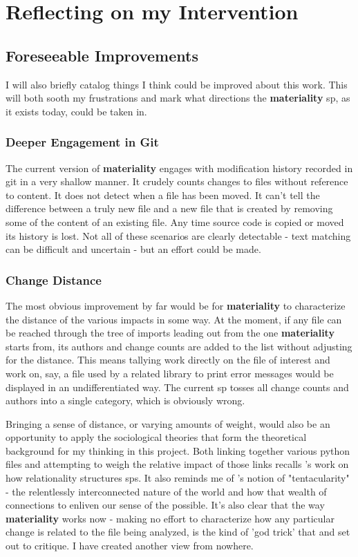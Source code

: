 \documentclass[a4paper,man,natbib,floatsintext]{apa6}
\begin{document}
  \section{Reflecting on my Intervention}
  
  \subsection{Foreseeable Improvements}
  I will also briefly catalog things I think could be improved about this work. This will both sooth my frustrations and mark what directions the \textbf{materiality} \gls{sp}, as it exists today, could be taken in.

  \subsubsection{Deeper Engagement in Git}
  The current version of \textbf{materiality} engages with modification history recorded in git in a very shallow manner. It crudely counts changes to files without reference to content. It does not detect when a file has been moved. It can't tell the difference between a truly new file and a new file that is created by removing some of the content of an existing file. Any time source code is copied or moved its history is lost. Not all of these scenarios are clearly detectable - text matching can be difficult and uncertain - but an effort could be made.

  \subsubsection{Change Distance}
  The most obvious improvement by far would be for \textbf{materiality} to characterize the distance of the various impacts in some way. At the moment, if any file can be reached through the tree of imports leading out from the one \textbf{materiality} starts from, its authors and change counts are added to the list without adjusting for the distance. This means tallying work directly on the file of interest and work on, say, a file used by a related library to print error messages would be displayed in an undifferentiated way. The current \gls{sp} tosses all change counts and authors into a single category, which is obviously wrong.

  Bringing a sense of distance, or varying amounts of weight, would also be an opportunity to apply the sociological theories that form the theoretical background for my thinking in this project. Both linking together various \Gls{python} files and attempting to weigh the relative impact of those links recalls \citet{Mackenzie2006-hb}'s work on how relationality structures \glspl{sp}. It also reminds me of \citet{Haraway2016-nc}'s notion of "tentacularity" - the relentlessly interconnected nature of the world and how that wealth of connections to enliven our sense of the possible. It's also clear that the way \textbf{materiality} works now - making no effort to characterize how any particular change is related to the file being analyzed, is the kind of 'god trick' that \citet{Harding1992-od} and \citet{Haraway1988-nh} set out to critique. I have created another view from nowhere.
\end{document}

